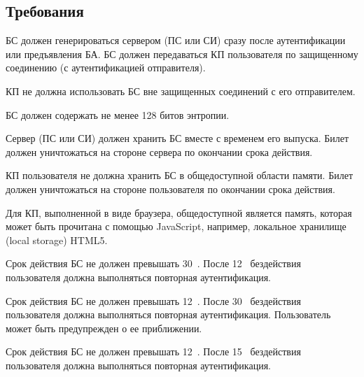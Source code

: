 \subsection{Требования}\label{SM.Reqs}

БС должен генерироваться сервером (ПС или СИ) сразу после аутентификации или 
предъявления БА. БС должен передаваться КП пользователя по защищенному 
соединению (с аутентификацией отправителя). 

КП не должна использовать БС вне защищенных соединений с его отправителем. 

БС должен содержать не менее 128 битов энтропии.


Сервер (ПС или СИ) должен хранить БС вместе с временем его выпуска.
Билет должен уничтожаться на стороне сервера по окончании срока действия.

КП пользователя не должна хранить БС в общедоступной области памяти.
Билет должен уничтожаться на стороне пользователя по окончании срока действия.

\begin{note*}
Для КП, выполненной в виде браузера, общедоступной является память,
которая может быть прочитана с помощью JavaScript, например,
локальное хранилище (local storage) HTML5.
%
\end{note*}

Срок действия БС не должен превышать 30~.
После 12~ бездействия пользователя 
должна выполняться повторная аутентификация.

Срок действия БС не должен превышать 12~.
После 30~ бездействия пользователя 
должна выполняться повторная аутентификация.
Пользователь может быть предупрежден о ее приближении.


Срок действия БС не должен превышать 12~.
После 15~ бездействия пользователя 
должна выполняться повторная аутентификация.


%
